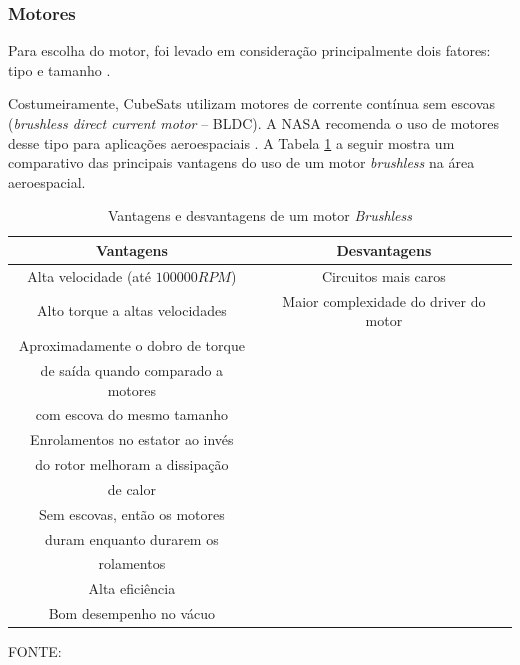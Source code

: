 \documentclass[
	12pt,				%
	openany,			%
	twoside,			%
	a4paper,			%
	english,			%
	french,				%
	spanish,			%
	brazil,				%
	oldfontcommands
	]{abntex2}
\begin{document}

\subsubsection{Motores}

Para escolha do motor, foi levado em consideração principalmente dois fatores: tipo e tamanho \cite{Ericksson}.

Costumeiramente, CubeSats utilizam motores de corrente contínua sem escovas (\textit{brushless direct current motor} – BLDC). A NASA recomenda o uso de motores desse tipo para aplicações aeroespaciais \cite{NASABLDC}. A Tabela \ref{tab:VnteDesv} a seguir mostra um comparativo das principais vantagens do uso de um motor \textit{brushless} na área aeroespacial.

\begin{table}[h]
	\caption{Vantagens e desvantagens de um motor \textit{Brushless}}
		\centering
	\begin{tabular}{|c|c|}
		\hline
		\textbf{Vantagens} & \textbf{Desvantagens} \\ 
		\hline 
		Alta velocidade (até $100000RPM$) & Circuitos mais caros \\ 
		\hline 
		Alto torque a altas velocidades & Maior complexidade do driver do motor \\ 
		\hline 
		Aproximadamente o dobro de torque & \\
		 de saída quando comparado a motores & \\
		  com escova do mesmo tamanho &  \\ 
		\hline 
		Enrolamentos no estator ao invés & \\
		 do rotor melhoram a dissipação & \\
		  de calor & \\ 
		\hline 
		Sem escovas, então os motores & \\
		 duram enquanto durarem os & \\
		  rolamentos & \\ 
		\hline 
		Alta eficiência & \\ 
		\hline 
		Bom desempenho no vácuo & \\ 
		\hline
	\end{tabular}
	
	\begin{small}
	\vspace{3pt}	
	FONTE: \cite{Ericksson}
	\end{small}
	\label{tab:VnteDesv}
\end{table}
\end{document}
